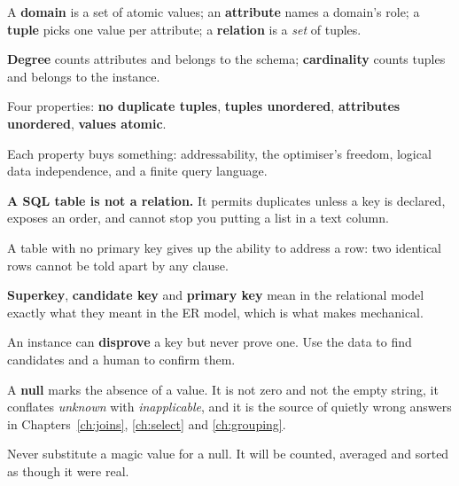 \begin{chaptersummary}
\begin{tight}
  \item A \textbf{domain} is a set of atomic values; an \textbf{attribute}
        names a domain's role; a \textbf{tuple} picks one value per attribute;
        a \textbf{relation} is a \emph{set} of tuples.
  \item \textbf{Degree} counts attributes and belongs to the schema;
        \textbf{cardinality} counts tuples and belongs to the instance.
  \item Four properties: \textbf{no duplicate tuples}, \textbf{tuples
        unordered}, \textbf{attributes unordered}, \textbf{values atomic}.
  \item Each property buys something: addressability, the optimiser's freedom,
        logical data independence, and a finite query language.
  \item \textbf{A SQL table is not a relation.} It permits duplicates unless a
        key is declared, exposes an order, and cannot stop you putting a list
        in a text column.
  \item A table with no primary key gives up the ability to address a row: two
        identical rows cannot be told apart by any  clause.
  \item \textbf{Superkey}, \textbf{candidate key} and \textbf{primary key} mean
        in the relational model exactly what they meant in the ER model, which
        is what makes  mechanical.
  \item An instance can \textbf{disprove} a key but never prove one. Use the
        data to find candidates and a human to confirm them.
  \item A \textbf{null} marks the absence of a value. It is not zero and not
        the empty string, it conflates \emph{unknown} with
        \emph{inapplicable}, and it is the source of quietly wrong answers in
        Chapters~\ref{ch:joins}, \ref{ch:select} and \ref{ch:grouping}.
  \item Never substitute a magic value for a null. It will be counted, averaged
        and sorted as though it were real.
\end{tight}
\end{chaptersummary}


